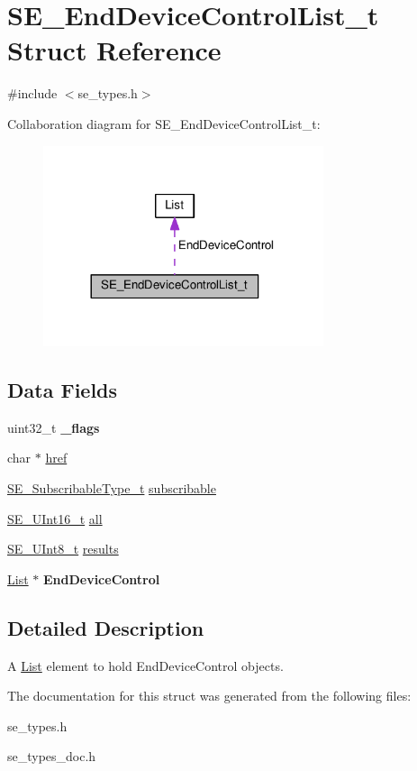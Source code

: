 \hypertarget{structSE__EndDeviceControlList__t}{}\section{S\+E\+\_\+\+End\+Device\+Control\+List\+\_\+t Struct Reference}
\label{structSE__EndDeviceControlList__t}


{\ttfamily \#include $<$se\+\_\+types.\+h$>$}



Collaboration diagram for S\+E\+\_\+\+End\+Device\+Control\+List\+\_\+t\+:\nopagebreak
\begin{figure}[H]
\begin{center}
\leavevmode
\includegraphics[width=233pt]{structSE__EndDeviceControlList__t__coll__graph}
\end{center}
\end{figure}
\subsection*{Data Fields}
\begin{DoxyCompactItemize}
\item 
uint32\+\_\+t {\bfseries \+\_\+flags}
\item 
char $\ast$ \hyperlink{group__EndDeviceControlList_gac58496760ce23c835d784789fdd5e800}{href}
\item 
\hyperlink{group__SubscribableType_ga5c41f553d369710ed34619266bf2551e}{S\+E\+\_\+\+Subscribable\+Type\+\_\+t} \hyperlink{group__EndDeviceControlList_ga904fa33399c54c6019f35032add14ab7}{subscribable}
\item 
\hyperlink{group__UInt16_gac68d541f189538bfd30cfaa712d20d29}{S\+E\+\_\+\+U\+Int16\+\_\+t} \hyperlink{group__EndDeviceControlList_ga0168ebdfbb23cee8d5b69dd8ea3bc6c6}{all}
\item 
\hyperlink{group__UInt8_gaf7c365a1acfe204e3a67c16ed44572f5}{S\+E\+\_\+\+U\+Int8\+\_\+t} \hyperlink{group__EndDeviceControlList_gaa08c142b0d0d594c9e10a7369d25ad6e}{results}
\item 
\hyperlink{structList}{List} $\ast$ {\bfseries End\+Device\+Control}
\end{DoxyCompactItemize}


\subsection{Detailed Description}
A \hyperlink{structList}{List} element to hold End\+Device\+Control objects. 

The documentation for this struct was generated from the following files\+:\begin{DoxyCompactItemize}
\item 
se\+\_\+types.\+h\item 
se\+\_\+types\+\_\+doc.\+h\end{DoxyCompactItemize}
